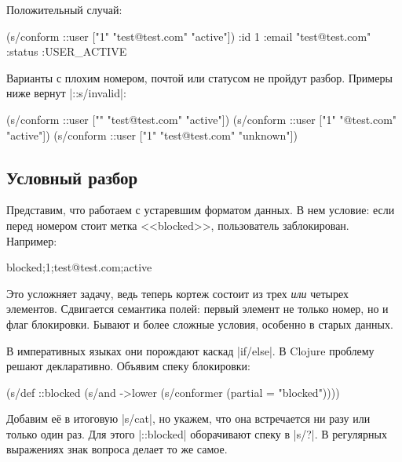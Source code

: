\noindent
Положительный случай:

\begin{english}
  \begin{clojure}
(s/conform ::user ["1" "test@test.com" "active"])
{:id 1
 :email "test@test.com"
 :status :USER_ACTIVE}
  \end{clojure}
\end{english}

Варианты с плохим номером, почтой или статусом не пройдут разбор. Примеры ниже
вернут \spverb|::s/invalid|:

\begin{english}
  \begin{clojure}
(s/conform ::user ["" "test@test.com" "active"])
(s/conform ::user ["1" "@test.com" "active"])
(s/conform ::user ["1" "test@test.com" "unknown"])
  \end{clojure}
\end{english}

\subsection{Условный разбор}

Представим, что работаем с устаревшим форматом данных. В нем условие: если перед
номером стоит метка <<blocked>>, пользователь заблокирован. Например:

\begin{english}
  \begin{text}
blocked;1;test@test.com;active
  \end{text}
\end{english}

Это усложняет задачу, ведь теперь кортеж состоит из трех \emph{или} четырех
элементов. Сдвигается семантика полей: первый элемент не только номер, но и флаг
блокировки. Бывают и более сложные условия, особенно в старых данных.

В императивных языках они порождают каскад \spverb|if/else|. В Clojure
проблему решают декларативно. Объявим спеку блокировки:

\begin{english}
  \begin{clojure}
(s/def ::blocked
  (s/and
   ->lower
   (s/conformer (partial = "blocked"))))
  \end{clojure}
\end{english}


Добавим е\"{е} в итоговую \spverb|s/cat|, но укажем, что она встречается ни разу или
только один раз. Для этого \spverb|::blocked| оборачивают спеку в \spverb|s/?|.
В регулярных выражениях знак вопроса делает то же самое.

